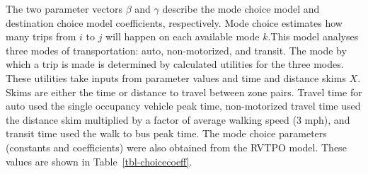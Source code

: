 \documentclass[
  letterpaper,
]{trb}
\begin{document}
The two parameter vectors \(\beta\) and \(\gamma\) describe the mode
choice model and destination choice model coefficients, respectively.
Mode choice estimates how many trips from \(i\) to \(j\) will happen on
each available mode \(k\).This model analyses three modes of
transportation: auto, non-motorized, and transit. The mode by which a
trip is made is determined by calculated utilities for the three modes.
These utilities take inputs from parameter values and time and distance
skims \(X\). Skims are either the time or distance to travel between
zone pairs. Travel time for auto used the single occupancy vehicle peak
time, non-motorized travel time used the distance skim multiplied by a
factor of average walking speed (3 mph), and transit time used the walk
to bus peak time. The mode choice parameters (constants and
coefficients) were also obtained from the RVTPO model. These values are
shown in Table~\ref{tbl-choicecoeff}.
\end{document}
